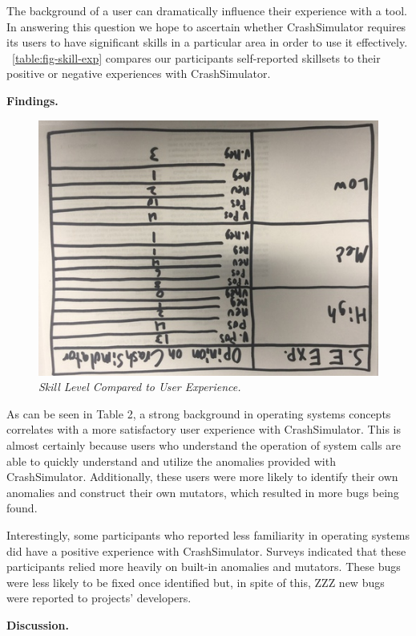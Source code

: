 The background of a user can
dramatically influence their experience with a
tool.  In answering this question we hope to ascertain whether
CrashSimulator requires its users to
have significant skills in a particular
area in order to use it effectively. ~\ref{table:fig-skill-exp}
compares our participants
self-reported skillsets to their positive or negative experiences with
CrashSimulator.


{\bf Findings. }

\begin{figure}[t]
  \center{}
  \includegraphics[scale=.5]{images/table2}
  \caption{\emph{Skill Level Compared to User Experience.}}
  \label{fig-skill-exp}
\end{figure}

As can be seen in Table 2, a strong background in operating systems
concepts correlates with a more satisfactory user experience with
CrashSimulator.  This is almost certainly because users who understand the
operation of system calls are able to quickly understand and utilize the
anomalies provided with CrashSimulator.  Additionally, these users were
more likely to identify their own anomalies and construct their own
mutators, which resulted in more bugs being found.

Interestingly, some participants who reported less familiarity in operating
systems did have a positive experience with CrashSimulator.
Surveys indicated
that these participants relied more heavily on built-in
anomalies and mutators.  These bugs were less likely to be fixed once
identified but, in spite of this, ZZZ new bugs were reported to projects'
developers.


{\bf Discussion. }

